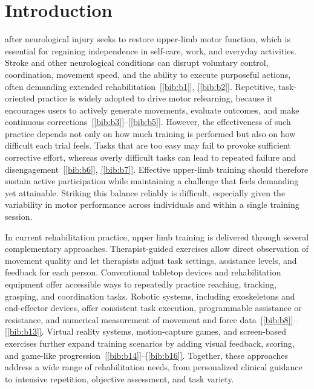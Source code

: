 \documentclass[journal,twoside,web]{ieeecolor2}
\newcommand{\citelink}[1]{\hyperref[bib:#1]{[\ref*{bib:#1}]}}
\newcommand{\citerange}[2]{\citelink{#1}--\citelink{#2}}
\begin{document}
\section{Introduction}
\label{sec:introduction}
 after neurological injury seeks to restore upper-limb motor function, which is essential for regaining independence in self-care, work, and everyday activities. Stroke and other neurological conditions can disrupt voluntary control, coordination, movement speed, and the ability to execute purposeful actions, often demanding extended rehabilitation~\citelink{b1}, \citelink{b2}. Repetitive, task-oriented practice is widely adopted to drive motor relearning, because it encourages users to actively generate movements, evaluate outcomes, and make continuous corrections~\citerange{b3}{b5}. However, the effectiveness of such practice depends not only on how much training is performed but also on how difficult each trial feels. Tasks that are too easy may fail to provoke sufficient corrective effort, whereas overly difficult tasks can lead to repeated failure and disengagement~\citelink{b6}, \citelink{b7}. Effective upper-limb training should therefore sustain active participation while maintaining a challenge that feels demanding yet attainable. Striking this balance reliably is difficult, especially given the variability in motor performance across individuals and within a single training session.

In current rehabilitation practice, upper limb training is delivered through several complementary approaches. Therapist-guided exercises allow direct observation of movement quality and let therapists adjust task settings, assistance levels, and feedback for each person. Conventional tabletop devices and rehabilitation equipment offer accessible ways to repeatedly practice reaching, tracking, grasping, and coordination tasks. Robotic systems, including exoskeletons and end-effector devices, offer consistent task execution, programmable assistance or resistance, and numerical measurement of movement and force data~\citerange{b8}{b13}. Virtual reality systems, motion-capture games, and screen-based exercises further expand training scenarios by adding visual feedback, scoring, and game-like progression~\citerange{b14}{b16}. Together, these approaches address a wide range of rehabilitation needs, from personalized clinical guidance to intensive repetition, objective assessment, and task variety.
\end{document}
